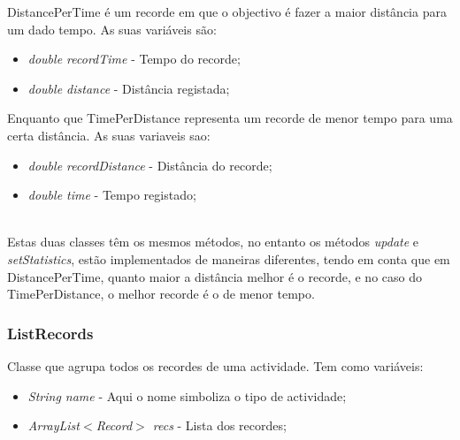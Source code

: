 \documentclass[10pt,notitlepage]{article}
\begin{document}
DistancePerTime é um recorde em que o objectivo é fazer a maior distância para um dado tempo.  
As suas variáveis são:
\begin{itemize}
\item \textit{double recordTime} - Tempo do recorde;
\item \textit{double distance} - Distância registada;
\end{itemize}
Enquanto que TimePerDistance representa um recorde de menor tempo para uma certa distância.
As suas variaveis sao:
\begin{itemize}
\item \textit{double recordDistance} - Distância do recorde;
\item \textit{double time} - Tempo registado;
\end{itemize}\\
Estas duas classes têm os mesmos métodos, no entanto os métodos \textit{update} e \textit{setStatistics}, estão implementados de maneiras diferentes, tendo em conta que em DistancePerTime, quanto maior a distância melhor é o recorde, e no caso do TimePerDistance,  o melhor recorde é o de menor tempo.


\subsubsection{ListRecords}

Classe que agrupa todos os recordes de uma actividade. Tem como variáveis:
\begin{itemize}
\item \textit{String name} - Aqui o nome simboliza o tipo de actividade;
\item \textit{ArrayList$<$Record$>$ recs} - Lista dos recordes;
\end{itemize}
\end{document}
